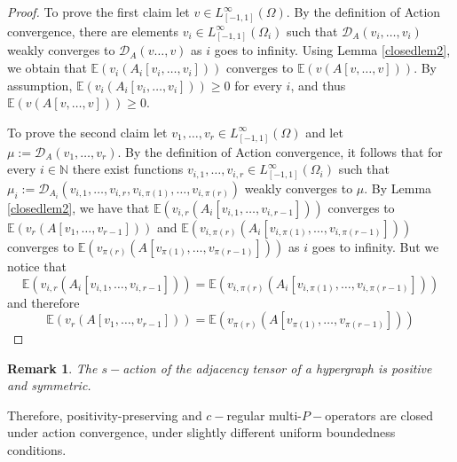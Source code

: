 \documentclass[11pt]{article}
\newtheorem{remark}[theorem]{Remark}
\begin{document}
\begin{proof} To prove the first claim let $v\in L^\infty_{[-1,1]}(\Omega)$. By the definition of Action convergence, there are elements $v_i\in L^\infty_{[-1,1]}(\Omega_i)$  such that $\mathcal{D}_A(v_i,\ldots,v_i)$ weakly converges to $\mathcal{D}_A(v\ldots, v)$ as $i$ goes to infinity. Using Lemma \ref{closedlem2}, we obtain that $\mathbb{E}(v_i(A_i[v_i,\ldots, v_i ]))$ converges to $\mathbb{E}(v(A[v,\ldots,v]))$. By assumption, $\mathbb{E}(v_i(A_i[v_i,\ldots, v_i ]))\geq 0$ for every $i$, and thus $\mathbb{E}(v(A[v,\ldots,v]))\geq 0$. 

To prove the second claim let $v_1,\ldots, v_{r}\in L^\infty_{[-1,1]}(\Omega)$ and let $\mu:=\mathcal{D}_A(v_1,\ldots,v_r)$. By the definition of Action convergence, it follows that for every $i\in\mathbb{N}$ there exist functions $v_{i,1},\ldots, v_{i,r}\in L_{[-1,1]}^\infty(\Omega_i)$ such that $\mu_i:=\mathcal{D}_{A_i}(v_{i,1},\ldots,v_{i,r},v_{i,\pi(1)},\ldots,v_{i,\pi(r)})$ weakly converges to $\mu$.  By Lemma \ref{closedlem2}, we have that $\mathbb{E}(v_{i,r}(A_i[v_{i,1},\ldots,v_{i,r-1}]))$ converges to $\mathbb{E}(v_r(A[v_1,\ldots,v_{r-1}]))$ and $\mathbb{E}(v_{i,\pi(r)}(A_i[v_{i,\pi(1)},\ldots,v_{i,\pi(r-1)}]))$ converges to $\mathbb{E}(v_{\pi(r)}(A[v_{\pi(1)},\ldots,v_{\pi(r-1)}]))$ as $i$ goes to infinity. But we notice that 
$$\mathbb{E}(v_{i,r}(A_i[v_{i,1},\ldots,v_{i,r-1}]))=\mathbb{E}(v_{i,\pi(r)}(A_i[v_{i,\pi(1)},\ldots,v_{i,\pi(r-1)}]))$$
and therefore $$
\mathbb{E}(v_r(A[v_1,\ldots,v_{r-1}]))=\mathbb{E}(v_{\pi(r)}(A[v_{\pi(1)},\ldots,v_{\pi(r-1)}]))
$$\end{proof} 

\begin{remark}
The $s-$action of the adjacency tensor of a hypergraph is positive and symmetric. 
\end{remark}
Therefore, positivity-preserving and $c-$regular multi-$P-$operators are closed under action convergence, under slightly different uniform boundedness conditions.
\end{document}
